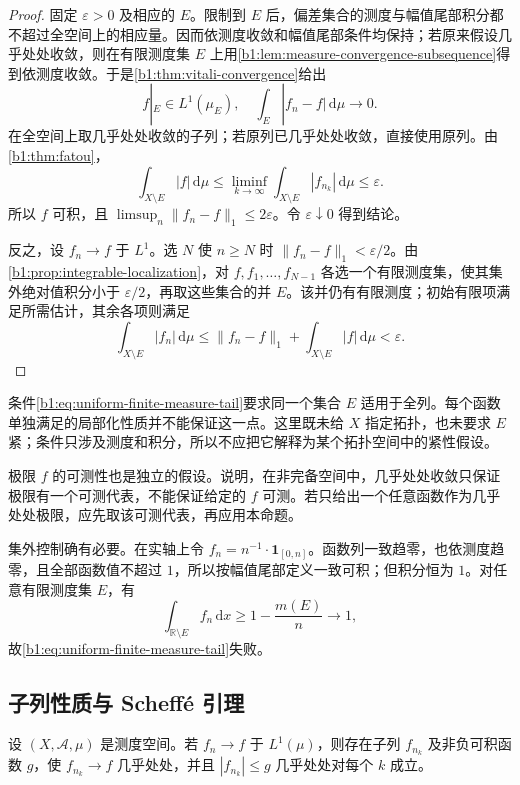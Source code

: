\begin{proof}
固定 \(\varepsilon>0\) 及相应的 \(E\)。限制到 \(E\) 后，偏差集合的测度与幅值尾部积分都不超过全空间上的相应量。因而依测度收敛和幅值尾部条件均保持；若原来假设几乎处处收敛，则在有限测度集 \(E\) 上用\cref{b1:lem:measure-convergence-subsequence}得到依测度收敛。于是\cref{b1:thm:vitali-convergence}给出
\[
f|_E\in L^1(\mu_E),
\quad\int_E|f_n-f|\,\mathrm d\mu\longrightarrow0.
\]
在全空间上取几乎处处收敛的子列；若原列已几乎处处收敛，直接使用原列。由\cref{b1:thm:fatou}，
\[
\int_{X\setminus E}|f|\,\mathrm d\mu
\leq\liminf_{k\to\infty}\int_{X\setminus E}|f_{n_k}|\,\mathrm d\mu
\leq\varepsilon.
\]
所以 \(f\) 可积，且 \(\limsup_n\|f_n-f\|_1\leq2\varepsilon\)。令 \(\varepsilon\downarrow0\) 得到结论。

反之，设 \(f_n\to f\) 于 \(L^1\)。选 \(N\) 使 \(n\geq N\) 时 \(\|f_n-f\|_1<\varepsilon/2\)。由\cref{b1:prop:integrable-localization}，对 \(f,f_1,\ldots,f_{N-1}\) 各选一个有限测度集，使其集外绝对值积分小于 \(\varepsilon/2\)，再取这些集合的并 \(E\)。该并仍有有限测度；初始有限项满足所需估计，其余各项则满足
\[
\int_{X\setminus E}|f_n|\,\mathrm d\mu
\leq\|f_n-f\|_1+\int_{X\setminus E}|f|\,\mathrm d\mu
<\varepsilon.
\]
\end{proof}

条件\eqref{b1:eq:uniform-finite-measure-tail}要求同一个集合 \(E\) 适用于全列。每个函数单独满足的局部化性质并不能保证这一点。这里既未给 \(X\) 指定拓扑，也未要求 \(E\) 紧；条件只涉及测度和积分，所以不应把它解释为某个拓扑空间中的紧性假设。

\ProseParagraphBreak

极限 \(f\) 的可测性也是独立的假设。说明，在非完备空间中，几乎处处收敛只保证极限有一个可测代表，不能保证给定的 \(f\) 可测。若只给出一个任意函数作为几乎处处极限，应先取该可测代表，再应用本命题。

\ProseParagraphBreak

集外控制确有必要。在实轴上令 \(f_n=n^{-1}\cdot\mathbf 1_{[0,n]}\)。函数列一致趋零，也依测度趋零，且全部函数值不超过 \(1\)，所以按幅值尾部定义一致可积；但积分恒为 \(1\)。对任意有限测度集 \(E\)，有
\[
\int_{\mathbb R\setminus E}f_n\,\mathrm dx
\geq1-\frac{m(E)}{n}\longrightarrow1,
\]
故\eqref{b1:eq:uniform-finite-measure-tail}失败。

\subsection{子列性质与 Scheff\'e 引理}
\label{b1:subsec:050505}

\begin{proposition}
\label{b1:prop:l1-dominated-subsequence}
设 \((X,\mathcal A,\mu)\) 是测度空间。若 \(f_n\to f\) 于 \(L^1(\mu)\)，则存在子列 \(f_{n_k}\) 及非负可积函数 \(g\)，使 \(f_{n_k}\to f\) 几乎处处，并且 \(|f_{n_k}|\leq g\) 几乎处处对每个 \(k\) 成立。
\end{proposition}

